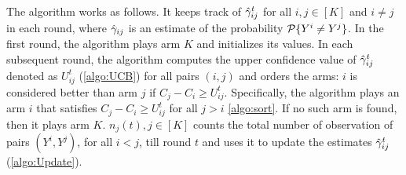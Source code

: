 	\vspace{.2cm}
The algorithm works as follows. It keeps track of $\hgamma^t_{ij}$ for all $i,j \in [K]$ and $i\neq j$ in each round, where $\hgamma_{ij}$ is an estimate of the probability $\P\{Y^i \neq Y^j\}$. In the first round, the algorithm plays arm $K$ and initializes its values. In each subsequent round, the algorithm computes the upper confidence value of $\hgamma^t_{ij}$ denoted as $U^t_{ij}$ (\ref{algo:UCB}) for all pairs $(i,j)$ and orders the arms: $i$ is considered better than arm $j$ if $C_j-C_i \geq U^t_{ij}$. Specifically, the algorithm plays an arm $i$ that satisfies $C_j-C_i \geq U^t_{ij}$ for all $j>i$ \ref{algo:sort}. If no such arm is found, then it plays arm $K$.  $n_j(t), j\in [K] $ counts the total number of observation of pairs $(Y^i, Y^j)$, for all $i<j$, till round $t$ and uses it to update the estimates $\hgamma_{ij}^t$ (\ref{algo:Update}).     